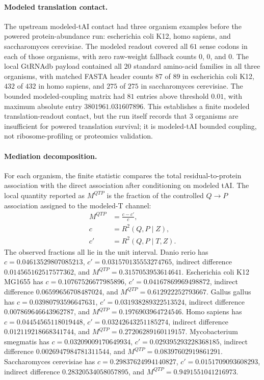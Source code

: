 \paragraph{Modeled translation contact.} The upstream modeled-tAI contact had three organism examples before the powered protein-abundance run: escherichia coli K12, homo sapiens, and saccharomyces cerevisiae.  The modeled readout covered all $61$ sense codons in each of those organisms, with zero raw-weight fallback counts $0$, $0$, and $0$.  The local GtRNAdb payload contained all $20$ standard amino-acid families in all three organisms, with matched FASTA header counts $87$ of $89$ in escherichia coli K12, $432$ of $432$ in homo sapiens, and $275$ of $275$ in saccharomyces cerevisiae.  The bounded modeled-coupling matrix had $81$ entries above threshold $0.01$, with maximum absolute entry $3801961.031607896$.  This establishes a finite modeled translation-readout contact, but the run itself records that $3$ organisms are insufficient for powered translation survival; it is modeled-tAI bounded coupling, not ribosome-profiling or proteomics validation.

\paragraph{Mediation decomposition.} For each organism, the finite statistic compares the total residual-to-protein association with the direct association after conditioning on modeled tAI.  The local quantity reported as $M^{QTP}$ is the fraction of the controlled $Q \to P$ association assigned to the modeled-T channel:
$$
\begin{aligned}
M^{QTP} &= \frac{c-c'}{c},\\
c &= R^2(Q,P \mid Z),\\
c' &= R^2(Q,P \mid T,Z).
\end{aligned}
$$
The observed fractions all lie in the unit interval.  Danio rerio has $c=0.04613529807085213$, $c'=0.031570135553274765$, indirect difference $0.014565162517577362$, and $M^{QTP}=0.3157053953614641$.  Escherichia coli K12 MG1655 has $c=0.10767526677985896$, $c'=0.04167869969498872$, indirect difference $0.06599656708487024$, and $M^{QTP}=0.612922252793667$.  Gallus gallus has $c=0.03980793596647631$, $c'=0.031938289322513524$, indirect difference $0.007869646643962787$, and $M^{QTP}=0.1976903964724546$.  Homo sapiens has $c=0.04454565118019448$, $c'=0.03242643251185274$, indirect difference $0.012119218668341744$, and $M^{QTP}=0.27206289160119157$.  Mycobacterium smegmatis has $c=0.03209009170649934$, $c'=0.029395293228368185$, indirect difference $0.0026947984781311544$, and $M^{QTP}=0.08397602919861291$.  Saccharomyces cerevisiae has $c=0.29837624994140827$, $c'=0.0151709093608293$, indirect difference $0.28320534058057895$, and $M^{QTP}=0.9491551041216973$.

